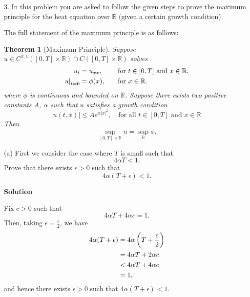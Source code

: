 \documentclass{article}
\newtheorem{theorem}{Theorem}
\begin{document}
\newpage

3. In this problem you are asked to follow the given steps to prove the
maximum principle for the heat equation over $\mathbb{R}$ (given a
certain growth condition).

The full statement of the maximum principle is as follows:
%
\begin{theorem}[Maximum Principle]
    Suppose
    $u \in C^{2, 1} ([0, T] \times \mathbb{R}) \cap C([0, T] \times \mathbb{R})$
    solves
    \begin{alignat*}{2}
        u_t &= u_{xx}, &&\quad\text{for } t \in [0, T] \text{ and } x \in \mathbb{R}, \\
        \eval[0]{u}_{t = 0} &= \phi(x), &&\quad\text{for } x \in \mathbb{R}.
    \end{alignat*}
    where $\phi$ is continuous and bounded on $\mathbb{R}$. Suppose
    there exists two positive constants $A$, $\alpha$ such that $u$
    satisfies a growth condition
    \begin{equation*}
        |u(t, x)| \leq A e^{\alpha |x|^2},
        \quad \text{for all } t \in [0, T] \text{ and } x \in \mathbb{R}
        .
    \end{equation*}
    Then
    \begin{equation}
        \sup_{[0, T] \times \mathbb{R}} u = \sup_{\mathbb{R}} \phi
        .
        \label{eq:2-1}
    \end{equation}
\end{theorem}
%
(a) First we consider the case where $T$ is small such that
%
\begin{equation}
    4 \alpha T < 1
    .
    \label{eq:2-2}
\end{equation}
%
Prove that there exists $\epsilon > 0$ such that
%
\begin{equation*}
    4 \alpha (T + \epsilon) < 1
    .
\end{equation*}

\textbf{Solution}

Fix $c > 0$ such that
%
\begin{equation*}
    4 \alpha T + 4 \alpha c = 1
    .
\end{equation*}
%
Then, taking $\epsilon = \frac{c}{2}$, we have
%
\begin{align*}
    4 \alpha (T + \epsilon)
        &= 4 \alpha \del{T + \frac{c}{2}} \\
        &= 4 \alpha T + 2 \alpha c \\
        &< 4 \alpha T + 4 \alpha c \\
        &= 1
    ,
\end{align*}
%
and hence there exists $\epsilon > 0$ such that
$4 \alpha (T + \epsilon) < 1$.
\end{document}
